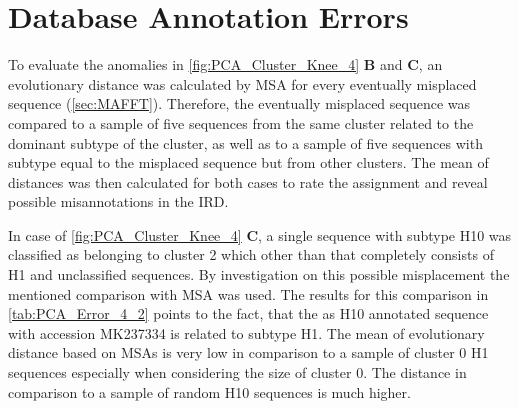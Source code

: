 \section{Database Annotation Errors} \label{sec:Clustering_Anomalies}

To evaluate the anomalies in \autoref{fig:PCA_Cluster_Knee_4} \textbf{\textsf{B}} and \textbf{\textsf{C}}, an evolutionary distance was calculated by \gls{MSA} for every eventually misplaced sequence (\autoref{sec:MAFFT}). Therefore, the eventually misplaced sequence was compared to a sample of five sequences from the same cluster related to the dominant subtype of the cluster, as well as to a sample of five sequences with subtype equal to the misplaced sequence but from other clusters. The mean of distances was then calculated for both cases to rate the assignment and reveal possible misannotations in the \gls{IRD}. 

\begin{table}[!hbt]
    \centering
    \caption[Anomalies in Segment 4 Cluster 2 (\texttt{PCA})]{\textbf{Anomalies in Segment 4 Cluster 2 (\texttt{PCA}).} The \glspl{MSA} mean distance of the given sequences in comparison to a sample of H1 sequences of the same cluster and a sample of H10 sequences present in other clusters.}
    \label{tab:PCA_Error_4_2}
\end{table}

In case of \autoref{fig:PCA_Cluster_Knee_4} \textbf{\textsf{C}}, a single sequence with subtype H10 was classified as belonging to cluster 2 which other than that completely consists of H1 and unclassified sequences. By investigation on this possible misplacement the mentioned comparison with \gls{MSA} was used. The results for this comparison in \autoref{tab:PCA_Error_4_2} points to the fact, that the as H10 annotated sequence with accession MK237334 is related to subtype H1. The mean of evolutionary distance based on \glspl{MSA} is very low in comparison to a sample of cluster 0 H1 sequences especially when considering the size of cluster 0. The distance in comparison to a sample of random H10 sequences is much higher. 

